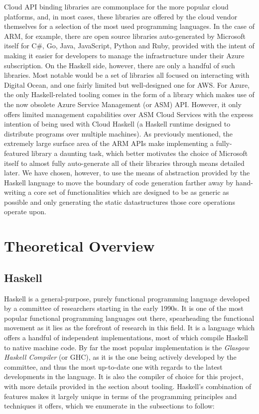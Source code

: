\documentclass[11pt]{report}
\begin{document}
Cloud API binding libraries are commonplace for the more popular cloud
platforms, and, in most cases, these libraries are offered by the cloud vendor
themselves for a selection of the most used programming languages.
In the case of ARM, for example, there are open source libraries
auto-generated by Microsoft itself for C\#, Go, Java, JavaScript, Python and
Ruby, provided with the intent of making it easier for developers to manage
the infrastructure under their Azure subscription. \newline
On the Haskell side, however, there are only a handful of such libraries. Most
notable would be a set of libraries all focused on interacting with Digital
Ocean, and one fairly limited but well-designed one for AWS\@. For Azure, the
only Haskell-related tooling comes in the form of a library which makes use of the
now obsolete Azure Service Management (or ASM) API\@. However, it only offers
limited management capabilities over ASM Cloud Services with the express intention
of being used with Cloud Haskell (a Haskell runtime designed to distribute
programs over multiple machines). \newline
As previously mentioned, the extremely large surface area of the ARM APIs make
implementing a fully-featured library a daunting task, which better motivates the
choice of Microsoft itself to almost fully auto-generate all of their libraries
through means detailed later. We have chosen, however, to use the means of
abstraction provided by the Haskell language to move the boundary of code
generation farther away by hand-writing a core set of functionalities which are
designed to be as generic as possible and only generating the static datastructures
those core operations operate upon.

\newpage

\chapter{Theoretical Overview}

\section{Haskell}

Haskell is a general-purpose, purely functional programming language developed
by a committee of researchers starting in the early 1990s. It is one of the most
popular functional programming languages out there, spearheading the
functional movement as it lies as the forefront of research in this field. It
is a language which offers a handful of independent implementations, most of which
compile Haskell to native machine code. By far the most popular implementation is
the \textit{Glasgow Haskell Compiler} (or GHC), as it is the one being actively
developed by the committee, and thus the most up-to-date one with regards to the
latest developments in the language. It is also the compiler of choice for this
project, with more details provided in the section about tooling.
Haskell's combination of features makes it largely unique in terms of the
programming principles and techniques it offers, which we enumerate in the
subsections to follow:
\end{document}

